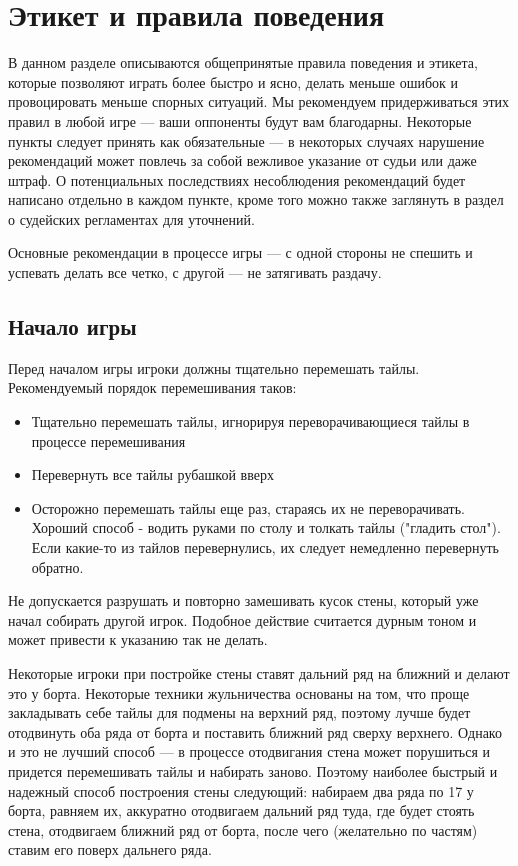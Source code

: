 \section{Этикет и правила поведения}

В данном разделе описываются общепринятые правила поведения и этикета, которые позволяют играть более быстро и ясно, делать меньше ошибок и провоцировать меньше спорных ситуаций. Мы рекомендуем придерживаться этих правил в любой игре --- ваши оппоненты будут вам благодарны. Некоторые пункты следует принять как обязательные --- в некоторых случаях нарушение рекомендаций может повлечь за собой вежливое указание от судьи или даже штраф. О потенциальных последствиях несоблюдения рекомендаций будет написано отдельно в каждом пункте, кроме того можно также заглянуть в раздел о судейских регламентах для уточнений.

Основные рекомендации в процессе игры --- с одной стороны не спешить и успевать делать все четко, с другой --- не затягивать раздачу. 

\subsection {Начало игры}

Перед началом игры игроки должны тщательно перемешать тайлы. Рекомендуемый порядок перемешивания таков:

\begin{itemize}
	\item Тщательно перемешать тайлы, игнорируя переворачивающиеся тайлы в процессе перемешивания
	\item Перевернуть все тайлы рубашкой вверх
	\item Осторожно перемешать тайлы еще раз, стараясь их не переворачивать. Хороший способ - водить руками по столу и толкать тайлы ("гладить стол"). Если какие-то из тайлов перевернулись, их следует немедленно перевернуть обратно.
\end{itemize}

Не допускается разрушать и повторно замешивать кусок стены, который уже начал собирать другой игрок. Подобное действие считается дурным тоном и может привести к указанию так не делать.

Некоторые игроки при постройке стены ставят дальний ряд на ближний и делают это у борта. Некоторые техники жульничества основаны на том, что проще закладывать себе тайлы для подмены на верхний ряд, поэтому лучше будет отодвинуть оба ряда от борта и поставить ближний ряд сверху верхнего. Однако и это не лучший способ --- в процессе отодвигания стена может порушиться и придется перемешивать тайлы и набирать заново. Поэтому наиболее быстрый и надежный способ построения стены следующий: набираем два ряда по 17 у борта, равняем их, аккуратно отодвигаем дальний ряд туда, где будет стоять стена, отодвигаем ближний ряд от борта, после чего (желательно по частям) ставим его поверх дальнего ряда. 

